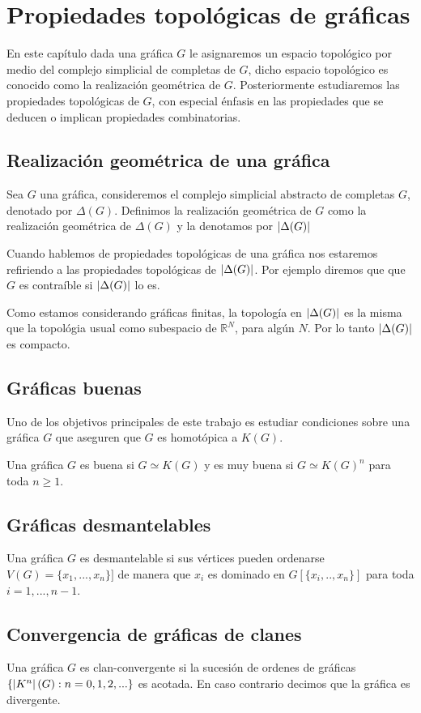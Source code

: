 \chapter{Propiedades topológicas de gráficas}
En este capítulo dada una gráfica $G$ le asignaremos un espacio topológico por medio del complejo simplicial de completas de $G$, dicho espacio topológico es conocido como la realización geométrica de $G$.
Posteriormente estudiaremos las propiedades topológicas de $G$, con especial énfasis en las propiedades que se deducen o implican propiedades combinatorias.

\section{Realización geométrica de una gráfica}
\begin{Defi}
Sea $G$ una gráfica, consideremos el complejo simplicial abstracto de completas $G$, denotado por $\Delta(G)$. Definimos la realización geométrica de $G$ como la realización geométrica de $\Delta(G)$ y la denotamos por $\left| \Delta(G) \right|$
\end{Defi}
Cuando hablemos de propiedades topológicas de una gráfica nos estaremos refiriendo a las propiedades topológicas de $\left| \Delta(G) \right|$. Por ejemplo diremos que que $G$ es contraíble si $\left| \Delta(G) \right|$ lo es.

Como estamos considerando gráficas finitas, la topología en $\left| \Delta(G) \right|$ es la misma que la topológia usual como subespacio de $\mathbb{R}^N$, para algún $N$. Por lo tanto $\left| \Delta(G) \right|$ es compacto.

\section{Gráficas buenas}
Uno de los objetivos principales de este trabajo es estudiar condiciones sobre una gráfica $G$ que aseguren que $G$ es homotópica a $K(G)$.
\begin{Defi}
Una gráfica $G$ es buena si $G\simeq K(G)$ y es muy buena si $G\simeq K(G)^n$ para toda $n\geq 1 $.
\end{Defi}

\section{Gráficas desmantelables}
\begin{Defi}
Una gráfica $G$ es desmantelable si sus vértices pueden ordenarse $V(G) = \{x_1,...,x_n\}]$ de manera que $x_i$ es dominado en $G[\{x_i,..,x_n\}]$ para toda $i = 1,...,n-1$.
\end{Defi}

\section{Convergencia de gráficas de clanes}
\begin{Defi}
Una gráfica $G$ es clan-convergente si la sucesión de ordenes de gráficas $\{\left| K^{n} \right|(G): n = 0,1,2,...\}$ es acotada. En caso contrario decimos que la gráfica es divergente.
\end{Defi}




